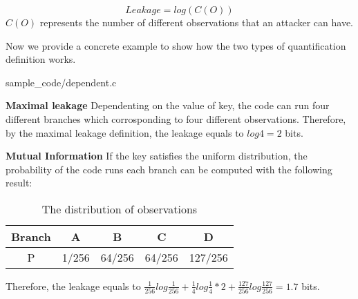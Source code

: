 \begin{equation}
    Leakage = log(C(O))
\end{equation}
$C(O)$ represents the number of different observations that an attacker can have.

Now we provide a concrete example to show how the two types of quantification definition works.

                 {sample_code/dependent.c}

\textbf{Maximal leakage} 
Dependenting on the value of key, the code can run four different branches which corrosponding to 
four different observations. Therefore, by the maximal leakage definition, the leakage equals to 
$log4 = 2$ bits.

\textbf{Mutual Information} If the key satisfies the uniform distribution, the probability of the code runs each branch
can be computed with the following result: 
\begin{table}[h]
\centering
\begin{tabular}{|c|c|c|c|c|}
\hline
Branch & A     & B      & C      & D       \\ \hline
P      & 1/256 & 64/256 & 64/256 & 127/256 \\ \hline
\end{tabular}
\caption{The distribution of observations}
\end{table}
Therefore, the leakage equals to 
$\frac{1}{256}log\frac{1}{256} + \frac{1}{4}log\frac{1}{4}*2 + \frac{127}{256}log\frac{127}{256} = 1.7$ bits.
